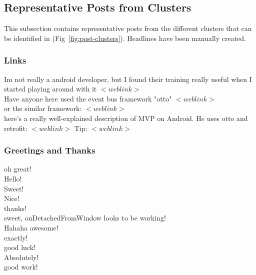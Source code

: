 \documentclass[11pt]{article}
\begin{document}
\subsection{Representative Posts from Clusters}

This subsection contains representative posts from the different clusters that can be identified in (Fig~\ref{fig:post-clusters}). Headlines have been manually created.

\subsubsection{Links}

Im not really a android developer, but I found their training really useful when I started playing around with it $<weblink>$ \vspace{.5em} \\
Have anyone here used the event bus framework "otto" $<weblink>$ \vspace{.5em} \\
or the similar framework: $<weblink>$ \vspace{.5em} \\
here's a really well-explained description of MVP on Android. He uses otto and retrofit: $<weblink>$
Tip: $<weblink>$ \vspace{.5em} \\


\subsubsection{Greetings and Thanks}
oh great! \vspace{.5em} \\
Hello! \vspace{.5em} \\
Sweet! \vspace{.5em} \\
Nice! \vspace{.5em} \\
thanks! \vspace{.5em} \\
sweet, onDetachedFromWindow looks to be working! \vspace{.5em} \\
Hahaha awesome! \vspace{.5em} \\
exactly! \vspace{.5em} \\
good luck! \vspace{.5em} \\
Absolutely! \vspace{.5em} \\
good work! \vspace{.5em} \\
\end{document}
